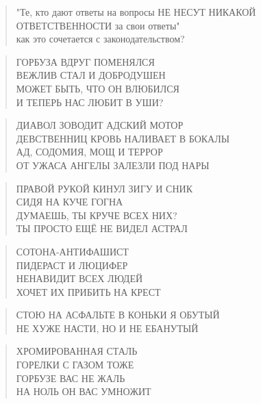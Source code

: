 \poemtitle{***}
\begin{verse}
"Те, кто дают ответы на вопросы НЕ НЕСУТ НИКАКОЙ ОТВЕТСТВЕННОСТИ за свои ответы"\\
как это сочетается с законодательством?
\end{verse}

\poemtitle{***}
\begin{verse}
ГОРБУЗА ВДРУГ ПОМЕНЯЛСЯ\\
ВЕЖЛИВ СТАЛ И ДОБРОДУШЕН\\
МОЖЕТ БЫТЬ, ЧТО ОН ВЛЮБИЛСЯ\\
И ТЕПЕРЬ НАС ЛЮБИТ В УШИ?
\end{verse}

\poemtitle{***}
\begin{verse}
ДИАВОЛ ЗОВОДИТ АДСКИЙ МОТОР\\
ДЕВСТВЕННИЦ КРОВЬ НАЛИВАЕТ В БОКАЛЫ\\
АД, СОДОМИЯ, МОЩ И ТЕРРОР\\
ОТ УЖАСА АНГЕЛЫ ЗАЛЕЗЛИ ПОД НАРЫ
\end{verse}

\poemtitle{***}
\begin{verse}
ПРАВОЙ РУКОЙ КИНУЛ ЗИГУ И СНИК\\
СИДЯ НА КУЧЕ ГОГНА\\
ДУМАЕШЬ, ТЫ КРУЧЕ ВСЕХ НИХ?\\
ТЫ ПРОСТО ЕЩЁ  НЕ ВИДЕЛ АСТРАЛ
\end{verse}

\poemtitle{***}
\begin{verse}
СОТОНА-АНТИФАШИСТ\\
ПИДЕРАСТ И ЛЮЦИФЕР\\
НЕНАВИДИТ ВСЕХ ЛЮДЕЙ\\
ХОЧЕТ ИХ ПРИБИТЬ НА КРЕСТ
\end{verse}

\poemtitle{***}
\begin{verse}
СТОЮ НА АСФАЛЬТЕ В КОНЬКИ Я ОБУТЫЙ\\
НЕ ХУЖЕ НАСТИ, НО И НЕ ЕБАНУТЫЙ
\end{verse}

\poemtitle{***}
\begin{verse}
ХРОМИРОВАННАЯ СТАЛЬ\\
ГОРЕЛКИ С ГАЗОМ ТОЖЕ\\
ГОРБУЗЕ ВАС НЕ ЖАЛЬ\\
НА НОЛЬ ОН ВАС УМНОЖИТ
\end{verse}

